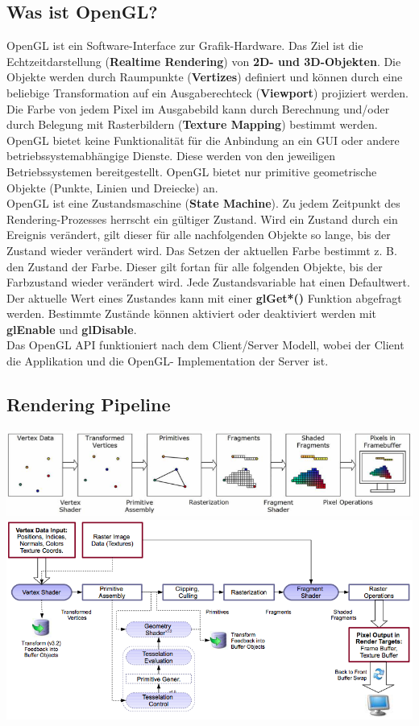 \documentclass[10pt]{article}
\begin{document}
\subsection{Was ist OpenGL?}
OpenGL ist ein Software-Interface zur Grafik-Hardware. Das Ziel ist die Echtzeitdarstellung (\textbf{Realtime Rendering}) von \textbf{2D- und 3D-Objekten}. Die Objekte werden durch Raumpunkte (\textbf{Vertizes}) definiert und können durch eine beliebige Transformation auf ein Ausgaberechteck (\textbf{Viewport}) projiziert werden. Die Farbe von jedem Pixel im Ausgabebild kann durch Berechnung und/oder durch Belegung mit Rasterbildern (\textbf{Texture Mapping}) bestimmt werden. \\
OpenGL bietet keine Funktionalität für die Anbindung an ein GUI oder andere betriebssystemabhängige Dienste. Diese werden von den jeweiligen Betriebssystemen bereitgestellt. OpenGL bietet nur primitive geometrische Objekte (Punkte, Linien und Dreiecke) an. \\
OpenGL ist eine Zustandsmaschine (\textbf{State Machine}). Zu jedem Zeitpunkt des Rendering-Prozesses herrscht ein gültiger Zustand. Wird ein Zustand durch ein Ereignis verändert, gilt dieser für alle nachfolgenden Objekte so lange, bis der Zustand wieder verändert wird. Das Setzen der aktuellen Farbe bestimmt z. B. den Zustand der Farbe. Dieser gilt fortan für alle folgenden Objekte, bis der Farbzustand wieder verändert wird. Jede Zustandsvariable hat einen Defaultwert. Der aktuelle Wert eines Zustandes kann mit einer \textbf{glGet*()} Funktion abgefragt werden. Bestimmte Zustände können aktiviert oder deaktiviert werden mit \textbf{glEnable} und \textbf{glDisable}. \\
Das OpenGL API funktioniert nach dem Client/Server Modell, wobei der Client die Applikation und die OpenGL- Implementation der Server ist.
\subsection{Rendering Pipeline}
\begin{center}
	\includegraphics[scale=0.5]{rendering_pipline.png}
	\includegraphics[scale=0.5]{rendering_pipline2.png}
\end{center}
\end{document}
